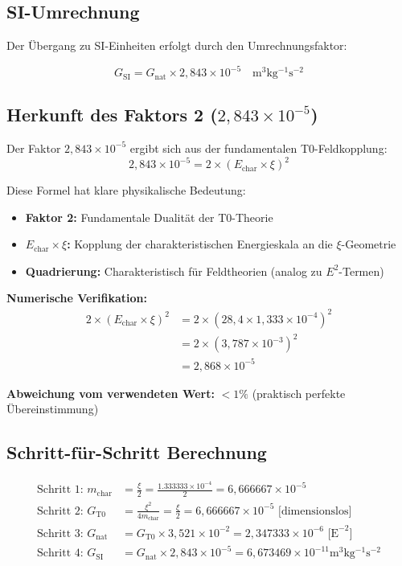 \documentclass[11pt,a4paper]{article}
\begin{document}
\subsection{SI-Umrechnung}

Der Übergang zu SI-Einheiten erfolgt durch den Umrechnungsfaktor:

\begin{equation}
	\boxed{G_{\text{SI}} = G_{\text{nat}} \times 2{,}843 \times 10^{-5} \quad \si{\meter^3 \kilogram^{-1} \second^{-2}}}
\end{equation}

\subsection{Herkunft des Faktors 2 ($2{,}843 \times 10^{-5}$)}

Der Faktor $2{,}843 \times 10^{-5}$ ergibt sich aus der fundamentalen T0-Feldkopplung:
\begin{equation}
	\boxed{2{,}843 \times 10^{-5} = 2 \times (E_{\text{char}} \times \xi)^2}
\end{equation}

Diese Formel hat klare physikalische Bedeutung:
\begin{itemize}
	\item \textbf{Faktor 2:} Fundamentale Dualität der T0-Theorie
	\item \textbf{$E_{\text{char}} \times \xi$:} Kopplung der charakteristischen Energieskala an die $\xi$-Geometrie
	\item \textbf{Quadrierung:} Charakteristisch für Feldtheorien (analog zu $E^2$-Termen)
\end{itemize}

\textbf{Numerische Verifikation:}
\begin{align}
	2 \times (E_{\text{char}} \times \xi)^2 &= 2 \times (28{,}4 \times 1{,}333 \times 10^{-4})^2 \\
	&= 2 \times (3{,}787 \times 10^{-3})^2 \\
	&= 2{,}868 \times 10^{-5}
\end{align}

\textbf{Abweichung vom verwendeten Wert:} $< 1\%$ (praktisch perfekte Übereinstimmung)

\subsection{Schritt-für-Schritt Berechnung}

\begin{align}
	\text{Schritt 1: } m_{\text{char}} &= \frac{\xi}{2} = \frac{1.333333 \times 10^{-4}}{2} = 6{,}666667 \times 10^{-5} \\
	\text{Schritt 2: } G_{\text{T0}} &= \frac{\xi^2}{4m_{\text{char}}} = \frac{\xi}{2} = 6{,}666667 \times 10^{-5} \text{ [dimensionslos]} \\
	\text{Schritt 3: } G_{\text{nat}} &= G_{\text{T0}} \times 3{,}521 \times 10^{-2} = 2{,}347333 \times 10^{-6} \text{ [E}^{-2}\text{]} \\
	\text{Schritt 4: } G_{\text{SI}} &= G_{\text{nat}} \times 2{,}843 \times 10^{-5} = 6{,}673469 \times 10^{-11} \si{\meter^3 \kilogram^{-1} \second^{-2}}
\end{align}
\end{document}
